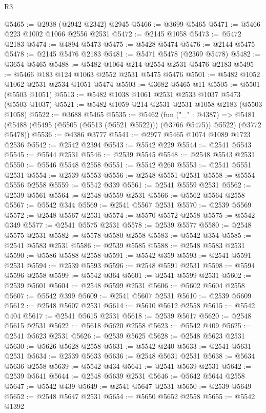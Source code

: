 \begin{lexlean}{R3}
\begin{coremodule}
@5465 := @2938 (@2942 @2342) @2945
@5466 := @3699 @5465
@5471 := @5466 @223 @1002 @1066 @2556 @2531
@5472 := @2145 @1058
@5473 := @5472 @2183
@5474 := @4894 @5473
@5475 := @5428 @5474
@5476 := @2144 @5475
@5478 := @2145 @5476 @2183
@5481 := @5471 @5478 (@2369 @5478)
@5482 := @3654 @5465
@5488 := @5482 @1064 @214 @2554 @2531 @5476 @2183
@5495 := @5466 @183 @124 @1063 @2552 @2531 @5475 @5476
@5501 := @5482 @1052 @1062 @2531 @2534 @1051 @5474
@5503 := @3682 @5465 @11
@5505 := @5501 (@5503 @1051)
@5513 := @5482 @1038 @1061 @2531 @2533 @1037 @5473 (@5503 @1037)
@5521 := @5482 @1059 @214 @2531 @2531 @1058 @2183 (@5503 @1058)
@5522 := @3688 @5465
@5535 := @5462
    (fun ("_" : @4387) =>
    @5481 (@5488 (@5495 (@5505 (@5513 (@5521 @5522))) (@3766 @5475)) @5522) (@3772 @5478))
@5536 := @4386 @3777
@5541 := @2977 @5465 @1074 @1089 @1723 @2536
@5542 := @2542 @2394
@5543 := @5542 @229
@5544 := @2541 @5543
@5545 := @5544 @2531
@5546 := @2539 @5545
@5548 := @2548 @5543 @2531
@5550 := @5546 @5548 @2558
@5551 := @5542 @260
@5553 := @2541 @5551 @2531
@5554 := @2539 @5553
@5556 := @2548 @5551 @2531
@5558 := @5554 @5556 @2558
@5559 := @5542 @339
@5561 := @2541 @5559 @2531
@5562 := @2539 @5561
@5564 := @2548 @5559 @2531
@5566 := @5562 @5564 @2558
@5567 := @5542 @344
@5569 := @2541 @5567 @2531
@5570 := @2539 @5569
@5572 := @2548 @5567 @2531
@5574 := @5570 @5572 @2558
@5575 := @5542 @349
@5577 := @2541 @5575 @2531
@5578 := @2539 @5577
@5580 := @2548 @5575 @2531
@5582 := @5578 @5580 @2558
@5583 := @5542 @354
@5585 := @2541 @5583 @2531
@5586 := @2539 @5585
@5588 := @2548 @5583 @2531
@5590 := @5586 @5588 @2558
@5591 := @5542 @359
@5593 := @2541 @5591 @2531
@5594 := @2539 @5593
@5596 := @2548 @5591 @2531
@5598 := @5594 @5596 @2558
@5599 := @5542 @364
@5601 := @2541 @5599 @2531
@5602 := @2539 @5601
@5604 := @2548 @5599 @2531
@5606 := @5602 @5604 @2558
@5607 := @5542 @399
@5609 := @2541 @5607 @2531
@5610 := @2539 @5609
@5612 := @2548 @5607 @2531
@5614 := @5610 @5612 @2558
@5615 := @5542 @404
@5617 := @2541 @5615 @2531
@5618 := @2539 @5617
@5620 := @2548 @5615 @2531
@5622 := @5618 @5620 @2558
@5623 := @5542 @409
@5625 := @2541 @5623 @2531
@5626 := @2539 @5625
@5628 := @2548 @5623 @2531
@5630 := @5626 @5628 @2558
@5631 := @5542 @240
@5633 := @2541 @5631 @2531
@5634 := @2539 @5633
@5636 := @2548 @5631 @2531
@5638 := @5634 @5636 @2558
@5639 := @5542 @434
@5641 := @2541 @5639 @2531
@5642 := @2539 @5641
@5644 := @2548 @5639 @2531
@5646 := @5642 @5644 @2558
@5647 := @5542 @439
@5649 := @2541 @5647 @2531
@5650 := @2539 @5649
@5652 := @2548 @5647 @2531
@5654 := @5650 @5652 @2558
@5655 := @5542 @1392

\end{coremodule}
\end{lexlean}
